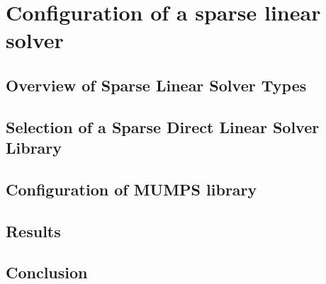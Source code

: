 \chapter{Configuration of a sparse linear solver}

	\section{Overview of Sparse Linear Solver Types}
	

	\section{Selection of a Sparse Direct Linear Solver Library} \label{chapter:solver-selection}
	


	\section{Configuration of MUMPS library} 
	

	\section{Results}
	

	\section{Conclusion}
	

